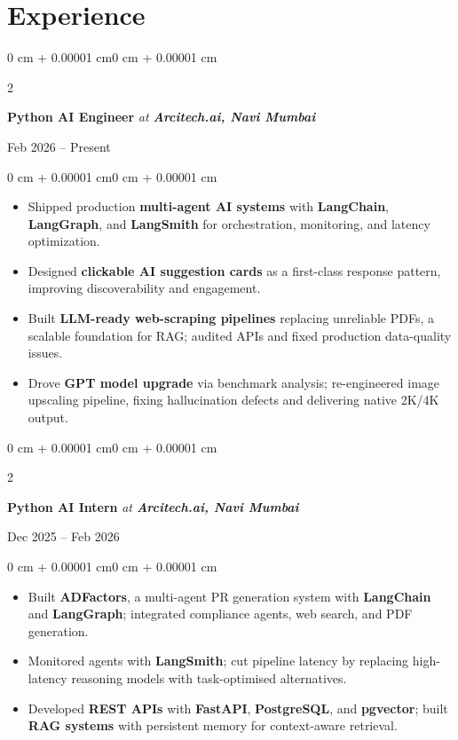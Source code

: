 \documentclass[10pt, letterpaper]{article}
\newenvironment{highlights}{
    \begin{itemize}[
        topsep=0.03 cm,
        parsep=0.03 cm,
        partopsep=0pt,
        itemsep=0pt,
        leftmargin=0 cm + 10pt
    ]
}{
    \end{itemize}
}
\newenvironment{onecolentry}{
    \begin{adjustwidth}{0 cm + 0.00001 cm}{0 cm + 0.00001 cm}
}{
    \end{adjustwidth}
}
\newenvironment{twocolentry}[2][]{
    \onecolentry
    \def\secondColumn{#2}
    \setcolumnwidth{\fill, 4.5 cm}
    \begin{paracol}{2}
}{
    \switchcolumn \raggedleft \secondColumn
    \end{paracol}
    \endonecolentry
}
\begin{document}
    \section{Experience}

    \begin{twocolentry}{\hfill Feb 2026 -- Present}
        \textbf{Python AI Engineer} \textit{at \textbf{Arcitech.ai, Navi Mumbai}}
    \end{twocolentry}
    \vspace{0.03 cm}
    \begin{onecolentry}
        \begin{highlights}
            \item Shipped production \textbf{multi-agent AI systems} with \textbf{LangChain}, \textbf{LangGraph}, and \textbf{LangSmith} for orchestration, monitoring, and latency optimization.
            \item Designed \textbf{clickable AI suggestion cards} as a first-class response pattern, improving discoverability and engagement.
            \item Built \textbf{LLM-ready web-scraping pipelines} replacing unreliable PDFs, a scalable foundation for RAG; audited APIs and fixed production data-quality issues.
            \item Drove \textbf{GPT model upgrade} via benchmark analysis; re-engineered image upscaling pipeline, fixing hallucination defects and delivering native 2K/4K output.
        \end{highlights}
    \end{onecolentry}

    \vspace{0.08 cm}

    \begin{twocolentry}{\hfill Dec 2025 -- Feb 2026}
        \textbf{Python AI Intern} \textit{at \textbf{Arcitech.ai, Navi Mumbai}}
    \end{twocolentry}
    \vspace{0.03 cm}
    \begin{onecolentry}
        \begin{highlights}
            \item Built \textbf{ADFactors}, a multi-agent PR generation system with \textbf{LangChain} and \textbf{LangGraph}; integrated compliance agents, web search, and PDF generation.
            \item Monitored agents with \textbf{LangSmith}; cut pipeline latency by replacing high-latency reasoning models with task-optimised alternatives.
            \item Developed \textbf{REST APIs} with \textbf{FastAPI}, \textbf{PostgreSQL}, and \textbf{pgvector}; built \textbf{RAG systems} with persistent memory for context-aware retrieval.
        \end{highlights}
    \end{onecolentry}
\end{document}
